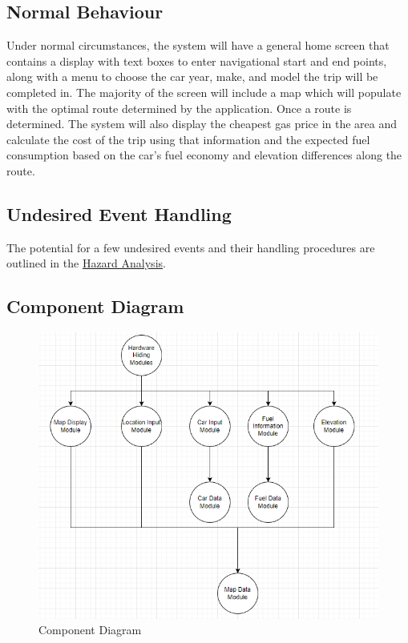 \documentclass[12pt, titlepage]{article}
\begin{document}
\subsection{Normal Behaviour}
Under normal circumstances, the system will have a general home screen that contains a display with text boxes to enter navigational start and end points, along with a menu to choose the car year, make, and model the trip will be completed in. The majority of the screen will include a map which will populate with the optimal route determined by the application. Once a route is determined. The system will also display the cheapest gas price in the area and calculate the cost of the trip using that information and the expected fuel consumption based on the car's fuel economy and elevation differences along the route.\\

\subsection{Undesired Event Handling}

The potential for a few undesired events and their handling procedures are outlined in the \href{https://github.com/mehtaj8/Greenway/blob/main/docs/HazardAnalysis/HazardAnalysis.pdf}{Hazard Analysis}.\\

\newpage
\subsection{Component Diagram}

\begin{figure}[h!]
    \centering
    \includegraphics[scale=1]{images/component-diagram.png}
    \caption{Component Diagram}
\end{figure}
\end{document}
